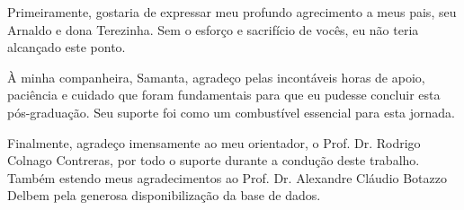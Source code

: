 \begin{agradecimentos}
	Primeiramente, gostaria de expressar meu profundo agrecimento a meus pais, seu Arnaldo e dona Terezinha. Sem o esforço e sacrifício de vocês, eu não teria alcançado este ponto.
	
	À minha companheira, Samanta, agradeço pelas incontáveis horas de apoio, paciência e cuidado que foram fundamentais para que eu pudesse concluir esta pós-graduação. Seu suporte foi como um combustível essencial para esta jornada.
	
	Finalmente, agradeço imensamente ao meu orientador, o Prof. Dr. Rodrigo Colnago Contreras, por todo o suporte durante a condução deste trabalho. Também estendo meus agradecimentos ao Prof. Dr. Alexandre Cláudio Botazzo Delbem pela generosa disponibilização da base de dados.
\end{agradecimentos}
